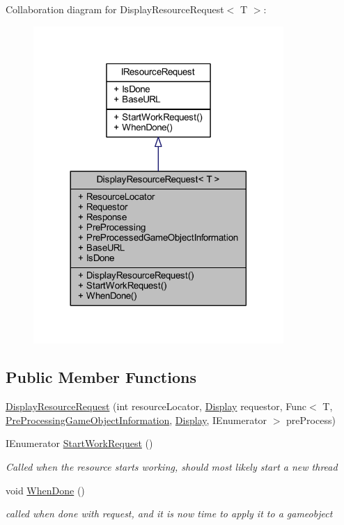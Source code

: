 Collaboration diagram for Display\+Resource\+Request$<$ T $>$\+:
\nopagebreak
\begin{figure}[H]
\begin{center}
\leavevmode
\includegraphics[width=269pt]{class_display_resource_request__coll__graph}
\end{center}
\end{figure}
\subsection*{Public Member Functions}
\begin{DoxyCompactItemize}
\item 
\mbox{\hyperlink{class_display_resource_request_a97001a4fd6ca62ee0c1a2e99f8ad3567}{Display\+Resource\+Request}} (int resource\+Locator, \mbox{\hyperlink{class_display}{Display}} requestor, Func$<$ T, \mbox{\hyperlink{class_pre_processing_game_object_information}{Pre\+Processing\+Game\+Object\+Information}}, \mbox{\hyperlink{class_display}{Display}}, I\+Enumerator $>$ pre\+Process)
\item 
I\+Enumerator \mbox{\hyperlink{class_display_resource_request_ab447f9d42e473b8bc8839c6f3d306a17}{Start\+Work\+Request}} ()
\begin{DoxyCompactList}\small\item\em Called when the resource starts working, should most likely start a new thread \end{DoxyCompactList}\item 
void \mbox{\hyperlink{class_display_resource_request_a60a8a75088ba20c6c42ebcab8309f1de}{When\+Done}} ()
\begin{DoxyCompactList}\small\item\em called when done with request, and it is now time to apply it to a gameobject \end{DoxyCompactList}\end{DoxyCompactItemize}
